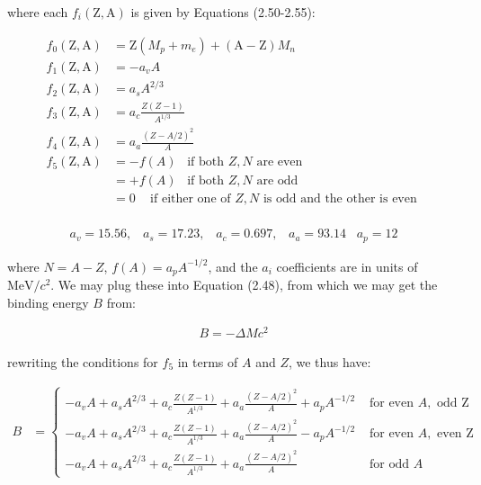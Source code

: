 \documentclass[11pt]{article}
\theoremstyle{definition}
\begin{document}
where each $f_i(\text{Z},\text{A})$ is given by Equations (2.50-2.55):

\begin{align*}
    f_0(\text{Z},\text{A}) &= \text{Z}(M_p + m_e) + (\text{A}-\text{Z})M_n \tag{2.50}\\
    f_1(\text{Z},\text{A}) &= -a_v  A \tag{2.51}\\
    f_2(\text{Z},\text{A}) &= a_s A^{2/3} \tag{2.52}\\
    f_3(\text{Z},\text{A}) &= a_c \frac{Z(Z-1)}{A^{1/3}} \tag{2.53}\\
    f_4(\text{Z},\text{A}) &= a_a \frac{(Z-A/2)^2}{A} \tag{2.54}\\
    f_5(\text{Z},\text{A}) &= -f(A)\;\;\; \text{if both } Z,N \text{ are even} \\
    &= +f(A)\;\;\; \text{if both } Z,N \text{ are odd} \tag{2.55}\\
    &= 0 \;\;\; \text{ if either one of } Z,N \text{ is odd and the other is even } \\
\end{align*}

\begin{align*}
    a_v = 15.56,\;\;\; a_s = 17.23,\;\;\; a_c = 0.697,\;\;\; a_a = 93.14 \;\;\; a_p = 12
\end{align*}

where $N=A-Z$, $f(A) = a_p A^{-1/2}$, and the $a_i$ coefficients are in units of $\text{MeV}/c^2$. We may plug these into Equation (2.48), from which we may get the binding energy $B$ from:

\begin{align}
    B = - \Delta Mc^2
\end{align}

rewriting the conditions for $f_5$ in terms of $A$ and $Z$, we thus have:

\begin{align}
    B &= 
    \begin{cases}
        -a_v  A + a_s A^{2/3} + a_c \frac{Z(Z-1)}{A^{1/3}} + a_a\frac{(Z-A/2)^2}{A} + a_p A^{-1/2} & \text{ for even } A,\text{ odd Z}\\
        -a_v  A + a_s A^{2/3} + a_c \frac{Z(Z-1)}{A^{1/3}} + a_a\frac{(Z-A/2)^2}{A} - a_p A^{-1/2} & \text{ for even }A,\text{ even Z}\\
        -a_v  A + a_s A^{2/3} + a_c \frac{Z(Z-1)}{A^{1/3}} + a_a\frac{(Z-A/2)^2}{A} & \text{ for odd }A
    \end{cases}
\end{align}
\end{document}
